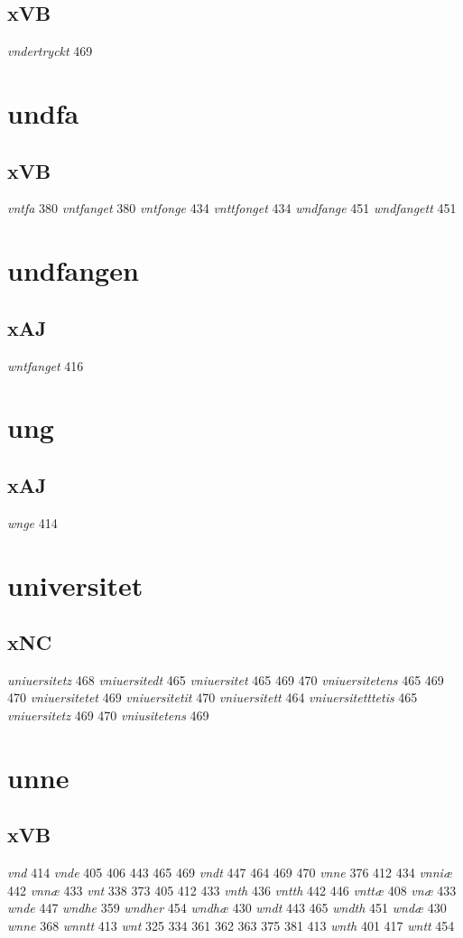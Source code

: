 \documentclass[a4paper,twocolumn]{article}
\begin{document}
\subsection{xVB}
\label{sec:orgdd630da}
\emph{vndertryckt} 469 
\section{undfa}
\label{sec:org4155a7b}
\subsection{xVB}
\label{sec:org7990138}
\emph{vntfa} 380 \emph{vntfanget} 380 \emph{vntfonge} 434 \emph{vnttfonget} 434 \emph{wndfange} 451 \emph{wndfangett} 451 
\section{undfangen}
\label{sec:orge169ca1}
\subsection{xAJ}
\label{sec:orgcbf920b}
\emph{wntfanget} 416 
\section{ung}
\label{sec:org2c5797f}
\subsection{xAJ}
\label{sec:org7f80798}
\emph{wnge} 414 
\section{universitet}
\label{sec:org42b40a3}
\subsection{xNC}
\label{sec:org9897b0e}
\emph{uniuersitetz} 468 \emph{vniuersitedt} 465 \emph{vniuersitet} 465 469 470 \emph{vniuersitetens} 465 469 470 \emph{vniuersitetet} 469 \emph{vniuersitetit} 470 \emph{vniuersitett} 464 \emph{vniuersitetttetis} 465 \emph{vniuersitetz} 469 470 \emph{vniusitetens} 469 
\section{unne}
\label{sec:orgddc2e54}
\subsection{xVB}
\label{sec:orge87ac66}
\emph{vnd} 414 \emph{vnde} 405 406 443 465 469 \emph{vndt} 447 464 469 470 \emph{vnne} 376 412 434 \emph{vnniæ} 442 \emph{vnnæ} 433 \emph{vnt} 338 373 405 412 433 \emph{vnth} 436 \emph{vntth} 442 446 \emph{vnttæ} 408 \emph{vnæ} 433 \emph{wnde} 447 \emph{wndhe} 359 \emph{wndher} 454 \emph{wndhæ} 430 \emph{wndt} 443 465 \emph{wndth} 451 \emph{wndæ} 430 \emph{wnne} 368 \emph{wnntt} 413 \emph{wnt} 325 334 361 362 363 375 381 413 \emph{wnth} 401 417 \emph{wntt} 454 
\end{document}
